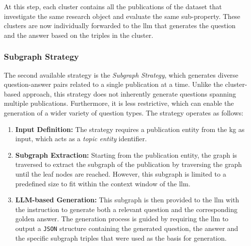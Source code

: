 At this step, each cluster contains all the publications of the dataset that investigate the same research object and evaluate the same sub-property. These clusters are now individually forwarded to the \gls{llm} that generates the question and the answer based on the triples in the cluster.


\subsubsection{Subgraph Strategy} 
The second available strategy is the \emph{Subgraph Strategy}, which generates diverse question-answer pairs related to a single publication at a time. Unlike the cluster-based approach, this strategy does not inherently generate questions spanning multiple publications. Furthermore, it is less restrictive, which can enable the generation of a wider variety of question types. The strategy operates as follows:


\begin{enumerate}
    \item \textbf{Input Definition:} The strategy requires a publication entity from the \gls{kg} as input, which acts as a \emph{topic entity} identifier.

    \item \textbf{Subgraph Extraction:} Starting from the publication entity, the graph is traversed to extract the subgraph of the publication by traversing the graph until the leaf nodes are reached. However, this subgraph is limited to a predefined size to fit within the context window of the \gls{llm}.

    \item \textbf{LLM-based Generation:} This subgraph is then provided to the \gls{llm} with the instruction to generate both a relevant question and the corresponding golden answer. The generation process is guided by requiring the \gls{llm} to output a \texttt{JSON} structure containing the generated question, the answer and the specific subgraph triples that were used as the basis for generation.
\end{enumerate}



